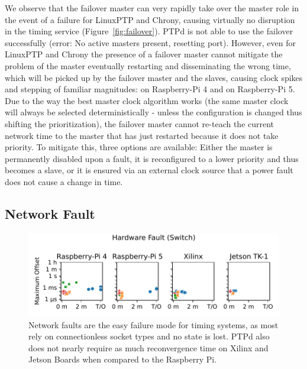 We observe that the failover master can very rapidly take over the master role in the event of a failure for LinuxPTP and Chrony, causing virtually no disruption in the timing service (Figure~\ref{fig:failover}). PTPd is not able to use the failover successfully (error: No active masters present, resetting port). However, even for LinuxPTP and Chrony the presence of a failover master cannot mitigate the problem of the master eventually restarting and disseminating the wrong time, which will be picked up by the failover master and the slaves, causing clock spikes and stepping of familiar magnitudes: \fTimeMin{\cmpMax} on Raspberry-Pi 4 and \fTimeMS{\cmpMax} on Raspberry-Pi 5. Due to the way the best master clock algorithm works (the same master clock will always be selected deterministically - unless the configuration is changed thus shifting the prioritization), the failover master cannot re-teach the current network time to the master that has just restarted because it does not take priority.
To mitigate this, three options are available: Either the master is permanently disabled upon a fault, it is reconfigured to a lower priority and thus becomes a slave, or it is ensured via an external clock source that a power fault does not cause a change in time.

\subsection{Network Fault}

\begin{figure}
    \includegraphics[width=\linewidth]{res/generated/fault/hardware/switch/fault_scatter.pdf}
    \caption{Network faults are the easy failure mode for timing systems, as most rely on connectionless socket types and no state is lost. PTPd also does not nearly require as much reconvergence time on Xilinx and Jetson Boards when compared to the Raspberry Pi.}
    \label{fig:network_fault}
\end{figure}

